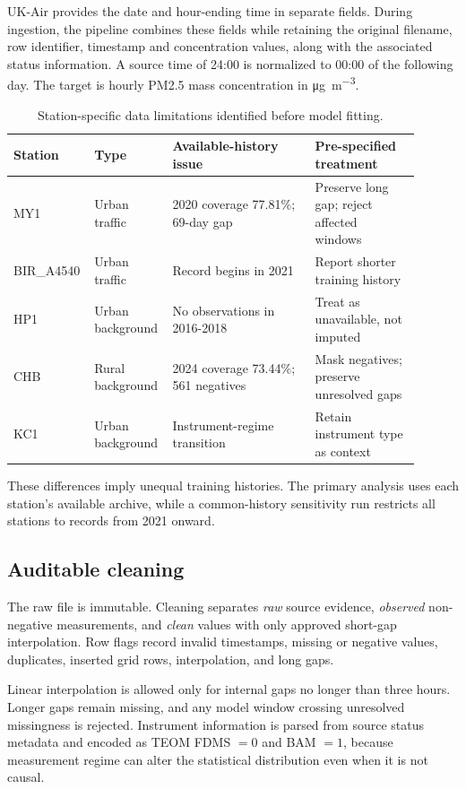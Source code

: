 \documentclass[sn-mathphys-num]{sn-jnl}
\begin{document}
UK-Air provides the date and hour-ending time in separate fields. During ingestion, the pipeline combines these fields while retaining the original filename, row identifier, timestamp and concentration values, along with the associated status information. A source time of 24:00 is
normalized to 00:00 of the following day. The target is hourly PM2.5 mass
concentration in \si{\micro\gram\per\cubic\meter}.

\begin{table}[tbp]
\centering
\caption{Station-specific data limitations identified before model fitting.}
\label{tab:station-quality}
\footnotesize
\begin{tabular}{p{0.13\linewidth}p{0.18\linewidth}p{0.34\linewidth}p{0.25\linewidth}}
\toprule
Station & Type & Available-history issue & Pre-specified treatment \\
\midrule
MY1 & Urban traffic & 2020 coverage 77.81\%; 69-day gap & Preserve long gap; reject affected windows \\
BIR\_A4540 & Urban traffic & Record begins in 2021 & Report shorter training history \\
HP1 & Urban background & No observations in 2016-2018 & Treat as unavailable, not imputed \\
CHB & Rural background & 2024 coverage 73.44\%; 561 negatives & Mask negatives; preserve unresolved gaps \\
KC1 & Urban background & Instrument-regime transition & Retain instrument type as context \\
\bottomrule
\end{tabular}
\end{table}

These differences imply unequal training histories. The primary analysis uses
each station's available archive, while a common-history sensitivity run
restricts all stations to records from 2021 onward.

\subsection{Auditable cleaning}
\label{sec:cleaning}

The raw file is immutable. Cleaning separates \emph{raw} source evidence,
\emph{observed} non-negative measurements, and \emph{clean} values with only
approved short-gap interpolation. Row flags record invalid timestamps, missing
or negative values, duplicates, inserted grid rows, interpolation, and long gaps.

Linear interpolation is allowed only for internal gaps no longer than three
hours. Longer gaps remain missing, and any model window crossing unresolved
missingness is rejected. Instrument information is parsed from source status
metadata and encoded as TEOM FDMS \(=0\) and BAM \(=1\), because measurement
regime can alter the statistical distribution even when it is not causal.
\end{document}
